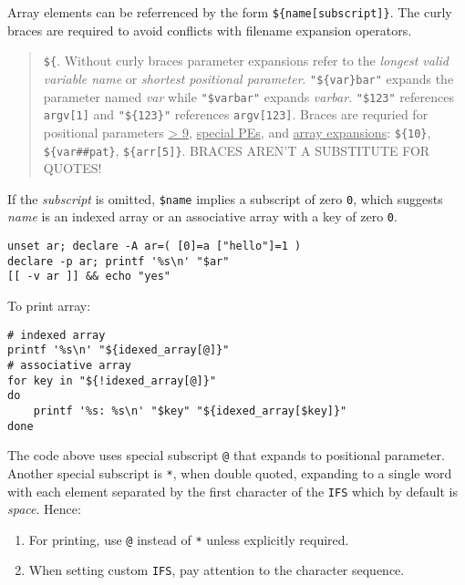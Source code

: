 Array elements can be referrenced by the form
\lstinline|${name[subscript]}|. The curly braces are required to
avoid conflicts with filename expansion operators.

\begin{quotation}
  \lstinline|${|. Without curly braces parameter expansions refer
    to the \textit{longest valid variable name} or
    \textit{shortest positional parameter}.
    \lstinline|"${var}bar"| expands the parameter named
    \textit{var} while \lstinline|"$varbar"| expands
    \textit{varbar}.
    \lstinline|"$123"| references \lstinline|argv[1]| and
    \lstinline|"${123}"| references \lstinline|argv[123]|. Braces
    are requried for positional parameters \uline{> 9},
    \uline{special PEs}, and \uline{array expansions}:
    \lstinline|${10}|, \lstinline|${var##pat}|,
    \lstinline|${arr[5]}|. BRACES AREN'T A SUBSTITUTE FOR QUOTES!
  \end{quotation}

If the \textit{subscript} is
omitted, \lstinline|$name| implies a subscript of zero \verb|0|,
which suggests \textit{name} is an indexed array or an associative
array with a key of zero \verb|0|.

\begin{lstlisting}
unset ar; declare -A ar=( [0]=a ["hello"]=1 )
declare -p ar; printf '%s\n' "$ar"
[[ -v ar ]] && echo "yes"
\end{lstlisting}

To print array:

\begin{lstlisting}
# indexed array
printf '%s\n' "${idexed_array[@]}"
# associative array
for key in "${!idexed_array[@]}"
do
    printf '%s: %s\n' "$key" "${idexed_array[$key]}"
done
\end{lstlisting}

The code above uses special subscript \lstinline|@| that expands
to positional parameter. Another special subscript is
\lstinline|*|, when double quoted, expanding to a single word with
each element separated by the first character of the
\lstinline|IFS| which by default is \textit{space}. Hence:

\begin{enumerate}
\item For printing, use \lstinline|@| instead of \lstinline|*|
  unless explicitly required.
\item When setting custom \lstinline|IFS|, pay attention to the
  character sequence.
\end{enumerate}

